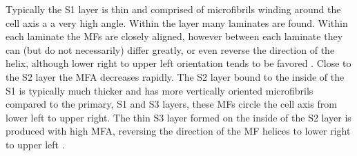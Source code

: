 Typically the S1 layer is thin and comprised of microfibrils winding around the
cell axis a a very high angle. Within the layer many laminates are found.
Within each laminate the MFs are closely aligned, however between each laminate
they can (but do not necessarily) differ greatly, or even reverse the direction
of the helix, although lower right to upper left
orientation tends to be favored \cite{fromm2013cellular}. Close to the S2 layer the MFA decreases
rapidly. The S2 layer bound to the inside of the S1 is typically much thicker and
has more vertically oriented microfibrils compared to the primary, S1 and S3
layers, these MFs circle the cell axis from lower left to upper right. The thin S3 layer formed on the inside of the S2 layer is produced with
high MFA, reversing the direction of the MF helices to lower right to upper
left \cite{walker1993primary}.